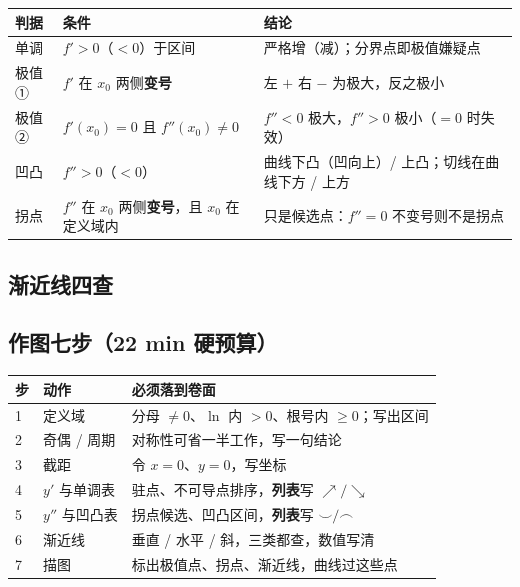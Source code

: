 \documentclass[UTF8,11pt]{ctexart}
\begin{document}
\begin{center}
\renewcommand{\arraystretch}{1.2}
\begin{tabular}{@{}p{2.6cm}p{6.0cm}p{6.2cm}@{}}
\toprule
\textbf{判据} & \textbf{条件} & \textbf{结论} \\
\midrule
单调 & $f'>0$（$<0$）于区间 & 严格增（减）；分界点即极值嫌疑点 \\
极值① & $f'$ 在 $x_0$ 两侧\textbf{变号} & 左 $+$ 右 $-$ 为极大，反之极小 \\
极值② & $f'(x_0)=0$ 且 $f''(x_0)\ne0$ & $f''<0$ 极大，$f''>0$ 极小（$=0$ 时失效）\\
凹凸 & $f''>0$（$<0$） & 曲线下凸（凹向上）/ 上凸；切线在曲线下方 / 上方 \\
拐点 & $f''$ 在 $x_0$ 两侧\textbf{变号}，且 $x_0$ 在定义域内 & 只是候选点：$f''=0$ 不变号则不是拐点 \\
\bottomrule
\end{tabular}
\end{center}

\subsection{渐近线四查}


\subsection{作图七步（22 min 硬预算）}

\begin{center}
\renewcommand{\arraystretch}{1.15}
\begin{tabular}{@{}p{0.9cm}p{3.0cm}p{10.7cm}@{}}
\toprule
\textbf{步} & \textbf{动作} & \textbf{必须落到卷面} \\
\midrule
1 & 定义域 & 分母 $\ne0$、$\ln$ 内 $>0$、根号内 $\ge0$；写出区间 \\
2 & 奇偶 / 周期 & 对称性可省一半工作，写一句结论 \\
3 & 截距 & 令 $x=0$、$y=0$，写坐标 \\
4 & $y'$ 与单调表 & 驻点、不可导点排序，\textbf{列表}写 $\nearrow/\searrow$ \\
5 & $y''$ 与凹凸表 & 拐点候选、凹凸区间，\textbf{列表}写 $\smile/\frown$ \\
6 & 渐近线 & 垂直 / 水平 / 斜，三类都查，数值写清 \\
7 & 描图 & 标出极值点、拐点、渐近线，曲线过这些点 \\
\bottomrule
\end{tabular}
\end{center}
\end{document}
